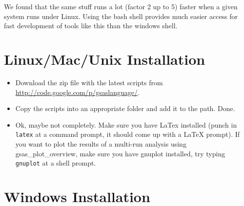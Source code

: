 We found that the same stuff runs a lot (factor 2 up to 5) faster when a given system runs under Linux. Using the bash shell provides much easier access for fast development of tools like this than the windows shell.

\section{Linux/Mac/Unix Installation}

\begin{itemize}
\item Download the zip file with the latest scripts from \url{http://code.google.com/p/gsaslanguage/}. 
\item Copy the scripts into an appropriate folder and add it to the path. Done.
\item Ok, maybe not completely. Make sure you have LaTex installed (punch in \texttt{latex} at a command prompt, it should come up with a LaTeX prompt). If you want to plot the results of a multi-run analysis using gsas\_plot\_overview, make sure you have gnuplot installed, try typing \texttt{gnuplot} at a shell prompt.
\end{itemize}

\section{Windows Installation}

